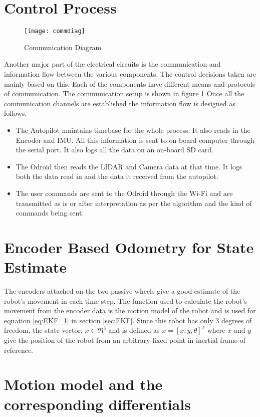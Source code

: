 \section{Control Process}
\begin{figure}[h]
\centering
\texttt{[image: commdiag]}
\caption{Communication Diagram}
\label{fig: CommDiag}
\end{figure}
Another major part of the electrical circuits is the communication and information flow between the various components. The control decisions taken are mainly based on this. Each of the components have different means and protocols of communication. The communication setup is shown in figure \ref{fig: CommDiag} Once all the communication channels are established the information flow is designed as follows.
\begin{itemize}
	\item The Autopilot maintains timebase for the whole process. It also reads in the Encoder and IMU. All this information is sent to on-board computer through the serial port. It also logs all the data on an on-board SD card.
	\item The Odroid then reads the LIDAR and Camera data at that time. It logs both the data read in and the data it received from the autopilot. 
	\item The user commands are sent to the Odroid through the Wi-Fi and are transmitted as is or after interpretation as per the algorithm and the kind of commands being sent. 
\end{itemize}

\section{Encoder Based Odometry for State Estimate}

The encoders attached on the two passive wheels give a good estimate of the robot's movement in each time step. The function used to calculate the robot's movement from the encoder data is the motion model of the robot and is used for equation \ref{eq:EKF_1} in section \ref{sec:EKF}. Since this robot has only 3 degrees of freedom, the state vector, $ x \in \Re^3 $ and is defined as $ x = [x,y,\theta]^T $ where $ x $ and $ y $ give the position of the robot from an arbitrary fixed point in inertial frame of reference. 

\section{Motion model and the corresponding differentials}

